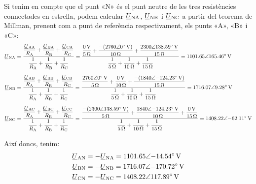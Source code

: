 \begin{exemple}
    Si tenim en compte que el punt «N» és el punt neutre de les tres resistències connectades en estrella, podem calcular $\cmplx{U}\ped{NA} $, $\cmplx{U}\ped{NB} $ i $\cmplx{U}\ped{NC}$ a partir del teorema de Millman, prenent com a punt de referència respectivament, els punts «A»,  «B»  i «C»:
    \begin{align*}
          \cmplx{U}\ped{NA} &= \frac{\dfrac{\cmplx{U}\ped{AA}}{R\ped{A}} + \dfrac{\cmplx{U}\ped{BA}}{R\ped{B}} + \dfrac{\cmplx{U}\ped{CA}}{R\ped{C}}}{\dfrac{1}{R\ped{A}} + \dfrac{1}{R\ped{B}} + \dfrac{1}{R\ped{C}}} = \frac{\dfrac{\qty{0}{V}}{\qty{5}{\ohm}} + \dfrac{-(\complexqty{2760:0}{V})}{\qty{10}{\ohm}} + \dfrac{\complexqty{2300:138,59}{V}}{\qty{15}{\ohm}}}{\dfrac{1}{\qty{5}{\ohm}} + \dfrac{1}{\qty{10}{\ohm}} + \dfrac{1}{\qty{15}{\ohm}}} = \complexqty{1101,65:165,46}{V} \\[1.5ex]
          \cmplx{U}\ped{NB} &= \frac{\dfrac{\cmplx{U}\ped{AB}}{R\ped{A}} + \dfrac{\cmplx{U}\ped{BB}}{R\ped{B}} + \dfrac{\cmplx{U}\ped{CB}}{R\ped{C}}}{\dfrac{1}{R\ped{A}} + \dfrac{1}{R\ped{B}} + \dfrac{1}{R\ped{C}}} = \frac{\dfrac{\complexqty{2760:0}{V}}{\qty{5}{\ohm}} + \dfrac{\qty{0}{V}}{\qty{10}{\ohm}} + \dfrac{-(\complexqty{1840:-124,23}{V})}{\qty{15}{\ohm}}}{\dfrac{1}{\qty{5}{\ohm}} + \dfrac{1}{\qty{10}{\ohm}} + \dfrac{1}{\qty{15}{\ohm}}} = \complexqty{1716,07:9,28}{V} \\[1.5ex]
          \cmplx{U}\ped{NC} &= \frac{\dfrac{\cmplx{U}\ped{AC}}{R\ped{A}} + \dfrac{\cmplx{U}\ped{BC}}{R\ped{B}} + \dfrac{\cmplx{U}\ped{CC}}{R\ped{C}}}{\dfrac{1}{R\ped{A}} + \dfrac{1}{R\ped{B}} + \dfrac{1}{R\ped{C}}} = \frac{\dfrac{-(\complexqty{2300:138,59}{V})}{\qty{5}{\ohm}} + \dfrac{\complexqty{1840:-124,23}{V}}{\qty{10}{\ohm}} + \dfrac{\qty{0}{V}}{\qty{15}{\ohm}}}{\dfrac{1}{\qty{5}{\ohm}} + \dfrac{1}{\qty{10}{\ohm}} + \dfrac{1}{\qty{15}{\ohm}}} = \complexqty{1408,22:-62.11}{V}
    \end{align*}

    Així doncs, tenim:
    \begin{align*}
        \cmplx{U}\ped{AN} &= -\cmplx{U}\ped{NA} =  \complexqty{1101,65:-14,54}{V} \\
        \cmplx{U}\ped{BN} &= -\cmplx{U}\ped{NB} =  \complexqty{1716,07:-170,72}{V} \\
        \cmplx{U}\ped{CN} &= -\cmplx{U}\ped{NC} =  \complexqty{1408,22:117,89}{V}
    \end{align*}


\end{exemple}
